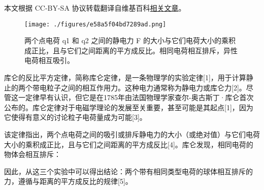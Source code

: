 
本文根据 CC-BY-SA 协议转载翻译自维基百科\href{https://en.wikipedia.org/wiki/Coulomb\%27s_law}{相关文章}。

\begin{figure}[ht]
\centering
\texttt{[image: ./figures/e58a5f04bd7289ad.png]}
\caption{两个点电荷 q1 和 q2 之间的静电力 F 的大小与它们电荷大小的乘积成正比，且与它们之间距离的平方成反比。相同电荷相互排斥，异性电荷相互吸引。} \label{fig_KL_1}
\end{figure}
库仑的反比平方定律，简称库仑定律，是一条物理学的实验定律[1]，用于计算静止的两个带电粒子之间的相互作用力。这种电力通常称为静电力或库仑力[2]。尽管这一定律早有认识，但它是在1785年由法国物理学家查尔-奥古斯丁·库仑首次公布的。库仑定律对于电磁学理论的发展至关重要，甚至可能是其起点[1]，因为它使得有意义的讨论粒子电荷量成为可能[3]。

该定律指出，两个点电荷之间的吸引或排斥静电力的大小（或绝对值）与它们电荷大小的乘积成正比，且与它们之间距离的平方成反比[4]。库仑发现，相同电荷的物体会相互排斥：

因此，从这三个实验中可以得出结论：两个带有相同类型电荷的球体相互排斥的力，遵循与距离的平方成反比的规律[5]。